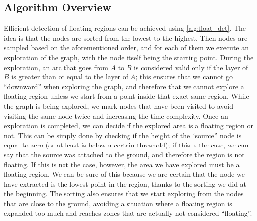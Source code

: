 \subsection{Algorithm Overview}

Efficient detection of floating regions can be achieved using \cref{alg:float_det}. The idea is that the nodes are sorted from the lowest to the highest. Then nodes
are sampled based on the aforementioned order, and for each of them we execute
an exploration of the graph, with the node itself being the starting point.
During the exploration, an arc that goes from $A$ to $B$ is
considered valid only if the layer of $B$ is greater than or equal to the layer of $A$;
this ensures that we cannot go ``downward'' when exploring the graph, and therefore that
we cannot explore a floating region unless we start from a point inside that exact same region.
While the graph is being explored, we mark nodes that have been visited to avoid visiting the same
node twice and increasing the time complexity. Once an exploration is completed, we can decide if
the explored area is a floating region or not. This can be simply done by checking if the height
of the ``source'' node is equal to zero (or at least is below a certain threshold);
if this is the case, we can say that the source was attached to the ground, and therefore
the region is not floating. If this is not the case, however, the area we have explored must be a
floating region. We can be sure of this because we are certain that the node we have extracted is the lowest point in the region,
thanks to the sorting we did at the beginning. The sorting also ensures that we start exploring from
the nodes that are close to the ground, avoiding a situation where a floating region is expanded
too much and reaches zones that are actually not considered ``floating''.

